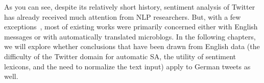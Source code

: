 As you can see, despite its relatively short history, sentiment
analysis of Twitter has already received much attention from NLP
researchers.  But, with a few
exceptions~\cite[\eg{}][]{Basile:13,Bosco:13,Araque:15,Cesteros:15},
most of existing works were primarily concerned either with English
messages or with automatically translated microblogs.  In the
following chapters, we will explore whether conclusions that have been
drawn from English data (the difficulty of the Twitter domain for
automatic SA, the utility of sentiment lexicons, and the need to
normalize the text input) apply to German tweets as well.






